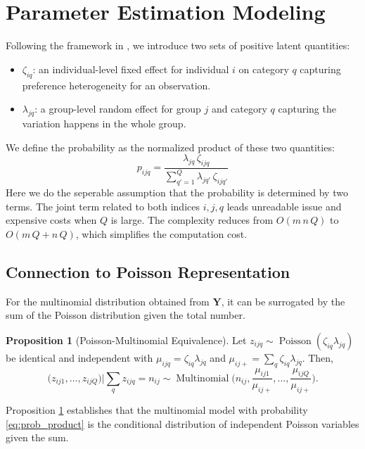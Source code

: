 \documentclass[]{report}
\theoremstyle{definition}
\newtheorem{proposition}{Proposition}
\begin{document}
\section{Parameter Estimation Modeling}
\label{PEM}
 Following the framework in \cite{lee2017poissontrickextensionsfitting}, we introduce two sets of positive latent quantities:
 \begin{itemize}
 \item $\zeta_{iq}$: an individual-level fixed effect for individual $i$ on category $q$ capturing preference heterogeneity for an observation.
 \item  $\lambda_{jq}$: a group-level random effect for group $j$ and category $q$ capturing the variation happens in the whole group.
\end{itemize}
We define the probability as the normalized product of these two quantities:
\begin{equation}
    p_{ijq}=\dfrac{\lambda_{jq}\,\zeta_{ijq}}{\sum_{q'=1}^{Q} \lambda_{jq'}\,\zeta_{ijq'}}
    \label{eq:prob_product}
\end{equation}
Here we do the seperable assumption that the probability is determined by two terms. The joint term related to both indices $i,j,q$ leads unreadable issue and expensive costs when $Q$ is large. The complexity reduces from $O(m\,n\,Q)$ to $O(m\,Q+n\,Q)$, which simplifies the computation cost.
\subsection{Connection to Poisson Representation}
\label{subsec:poisson_connection}
For the multinomial distribution obtained from $\bm{Y}$, it can be surrogated by the sum of the Poisson distribution given the total number.
\begin{proposition}[Poisson-Multinomial Equivalence]
\label{pme}
Let $z_{ijq}\sim \operatorname{Poisson}(\zeta_{iq}\lambda_{jq})$ be identical and independent with $\mu_{ijq}=\zeta_{iq}\lambda_{jq}$ and $\mu_{ij+}=\sum_{q}\zeta_{iq}\lambda_{jq}$. Then,
\begin{equation}
    \bigl(z_{ij1},\dots , z_{ijQ}\bigr)\Big| \sum_{q} z_{ijq}=n_{ij} \sim \operatorname{Multinomial}\bigl(n_{ij}, \frac{\mu_{ij1}}{\mu_{ij+}},\dots, \frac{\mu_{ijQ}}{\mu_{ij+}}\bigr) .
    \label{Poisson_trick}
\end{equation}
\end{proposition}
Proposition \ref{pme} establishes that the multinomial model with probability \ref{eq:prob_product} is the conditional distribution of independent Poisson variables given the sum. 
\end{document}
